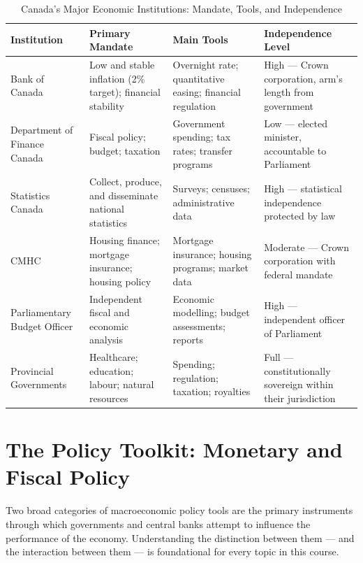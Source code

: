 \begin{table}[H]
\centering
\caption{Canada's Major Economic Institutions: Mandate, Tools, and Independence}
\label{tab:institutions}
\renewcommand{\arraystretch}{1.35}
\begin{tabular}{p{3.1cm}p{3.6cm}p{2.8cm}p{2.8cm}}
\toprule
\textbf{Institution} & \textbf{Primary Mandate} & \textbf{Main Tools}
                     & \textbf{Independence Level} \\
\midrule
Bank of Canada
  & Low and stable inflation (2\% target); financial stability
  & Overnight rate; quantitative easing; financial regulation
  & High --- Crown corporation, arm's length from government \\
\addlinespace
Department of Finance Canada
  & Fiscal policy; budget; taxation
  & Government spending; tax rates; transfer programs
  & Low --- elected minister, accountable to Parliament \\
\addlinespace
Statistics Canada
  & Collect, produce, and disseminate national statistics
  & Surveys; censuses; administrative data
  & High --- statistical independence protected by law \\
\addlinespace
CMHC
  & Housing finance; mortgage insurance; housing policy
  & Mortgage insurance; housing programs; market data
  & Moderate --- Crown corporation with federal mandate \\
\addlinespace
Parliamentary Budget Officer
  & Independent fiscal and economic analysis
  & Economic modelling; budget assessments; reports
  & High --- independent officer of Parliament \\
\addlinespace
Provincial Governments
  & Healthcare; education; labour; natural resources
  & Spending; regulation; taxation; royalties
  & Full --- constitutionally sovereign within their jurisdiction \\
\bottomrule
\end{tabular}
\end{table}

\section{The Policy Toolkit: Monetary and Fiscal Policy}
\label{sec:policy_toolkit}

Two broad categories of macroeconomic policy tools are the primary instruments
through which governments and central banks attempt to influence the
performance of the economy. Understanding the distinction between them ---
and the interaction between them --- is foundational for every topic in
this course.

